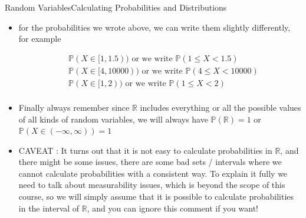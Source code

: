 \documentclass[8pt, usepdftitle = false]{beamer}
\begin{document}
\begin{frame}[allowframebreaks]{Random Variables}{Calculating Probabilities and Distributions}
\begin{itemize}
\begin{align*}
	&\mathbb{P}(X \in [1, 1.5)) \\
	&\mathbb{P}(X \in [4, 10000)) \\
	&\mathbb{P}( X \in [1, 2)) \\
\end{align*}
















\item for the probabilities we wrote above, we can write them slightly differently, for example 



\begin{align*}
	&\mathbb{P}(X \in [1, 1.5)) \text{ or we write } \mathbb{P}( 1 \leq X <  1.5)\\
	&\mathbb{P}(X \in [4, 10000)) \text{ or we write } \mathbb{P}( 4 \leq X <  10000)\\
	&\mathbb{P}(X \in [1, 2)) \text{ or we write } \mathbb{P}( 1 \leq X <  2)\\
\end{align*}


\framebreak



\item Finally always remember since $\mathbb{R}$ includes everything or all the possible values of all kinds of random variables, we will always have $\mathbb{P}(\mathbb{R}) = 1$ or $\mathbb{P}(X \in (-\infty, \infty)) = 1$


\item \alert{CAVEAT \faMugHot :} It turns out that it is not easy to calculate probabilities in $\mathbb{R}$, and there might be some issues, there are some bad sets / intervals where we cannot calculate probabilities with a consistent way. To explain it fully we need to talk about measurability issues, which is beyond the scope of this course, so we will simply assume that it is possible to calculate probabilities in the interval of $\mathbb{R}$, and you can ignore this comment if you want!



\end{itemize}
\end{frame}
\end{document}
